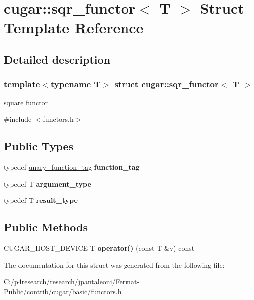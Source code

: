 \hypertarget{structcugar_1_1sqr__functor}{}\section{cugar\+:\+:sqr\+\_\+functor$<$ T $>$ Struct Template Reference}
\label{structcugar_1_1sqr__functor}


\subsection{Detailed description}
\subsubsection*{template$<$typename T$>$\newline
struct cugar\+::sqr\+\_\+functor$<$ T $>$}

square functor 

{\ttfamily \#include $<$functors.\+h$>$}

\subsection*{Public Types}
\begin{DoxyCompactItemize}
\item 
\mbox{\label{structcugar_1_1sqr__functor_aefe6fcc5f751202291f898214756d10c}} 
typedef \hyperlink{structcugar_1_1unary__function__tag}{unary\+\_\+function\+\_\+tag} {\bfseries function\+\_\+tag}
\item 
\mbox{\label{structcugar_1_1sqr__functor_abbd0f52c77762da36b45b7702d5c141b}} 
typedef T {\bfseries argument\+\_\+type}
\item 
\mbox{\label{structcugar_1_1sqr__functor_afc0e4dfed9b7abcf922f01d985489f80}} 
typedef T {\bfseries result\+\_\+type}
\end{DoxyCompactItemize}
\subsection*{Public Methods}
\begin{DoxyCompactItemize}
\item 
\mbox{\label{structcugar_1_1sqr__functor_a85ee76b07695cbffd2c164223ac1602d}} 
C\+U\+G\+A\+R\+\_\+\+H\+O\+S\+T\+\_\+\+D\+E\+V\+I\+CE T {\bfseries operator()} (const T \&v) const
\end{DoxyCompactItemize}


The documentation for this struct was generated from the following file\+:\begin{DoxyCompactItemize}
\item 
C\+:/p4research/research/jpantaleoni/\+Fermat-\/\+Public/contrib/cugar/basic/\hyperlink{functors_8h}{functors.\+h}\end{DoxyCompactItemize}
